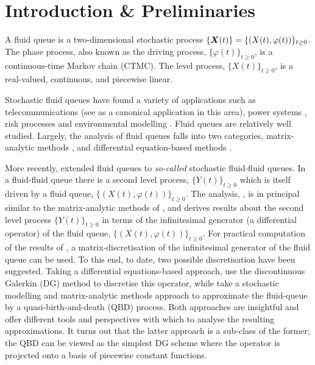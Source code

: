 \chapter{Introduction \& Preliminaries \label{ch:intro}} 
A fluid queue is a two-dimensional stochastic process \(\{\boldsymbol X(t)\} = \{(X(t),\varphi(t))\}_{t\geq0}\). The phase process, also known as the driving process, \(\{\varphi(t)\}_{t\geq0}\), is a continuous-time Markov chain (CTMC). The level process, \(\{X(t)\}_{t\geq0}\), is a real-valued, continuous, and piecewise linear. 

Stochastic fluid queues have found a variety of applications such as telecommunications (see \cite{anick1982} as a canonical application in this area), power systems \citep{hydro}, risk processes \citep{betal2005} and environmental modelling \citep{wurm2020}. Fluid queues are relatively well studied. Largely, the analysis of fluid queues falls into two categories, matrix-analytic methods \citep{ajr2005,ar2003,ar2004,bean2005b,bean2005,bot08,bean2009,dasilva2005,latouche2018}, and differential equation-based methods \citep{anick1982,kk1995,beanetal2019}. %

More recently, \cite{bo2014} extended fluid queues to \emph{so-called} stochastic fluid-fluid queues. In a fluid-fluid queue there is a second level process, \(\{Y(t)\}_{t\geq0}\) which is itself driven by a fluid queue, \(\{(X(t),\varphi(t))\}_{t\geq0}\). The analysis,  \citep{bo2014}, is in principal similar to the matrix-analytic methods of \citep{bean2005}, and derives results about the second level process \(\{Y(t)\}_{t\geq0}\) in terms of the infinitesimal generator (a differential operator) of the fluid queue, \(\{(X(t),\varphi(t))\}_{t\geq0}\). For practical computation of the results of \cite{bo2014}, a matrix-discretisation of the infinitesimal generator of the fluid queue can be used. To this end, to date, two possible discretisation have been suggested. Taking a differential equations-based approach, \cite{beanetal2019} use the discontinuous Galerkin (DG) method to discretise this operator, while \cite{bo2013} take a stochastic modelling and matrix-analytic methods approach to approximate the fluid-queue by a quasi-birth-and-death (QBD) process. Both approaches are insightful and offer different tools and perspectives with which to analyse the resulting approximations. It turns out that the latter approach is a sub-class of the former; the QBD can be viewed as the simplest DG scheme where the operator is projected onto a basis of piecewise constant functions.

